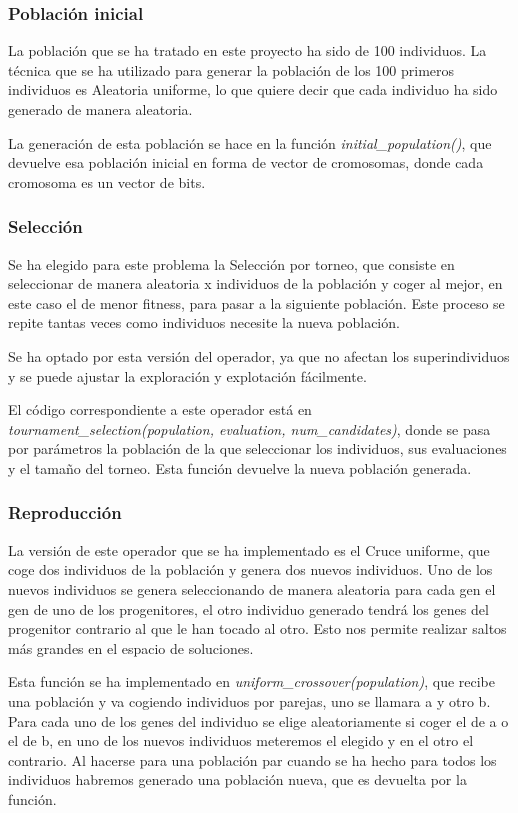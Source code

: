 \documentclass[12pt, spanish, pdftex]{UC3M_document}
\begin{document}
\subsubsection{Población inicial}
La población que se ha tratado en este proyecto ha sido de 100 individuos. La técnica que se ha utilizado para generar la población de los 100 primeros individuos es Aleatoria uniforme, lo que quiere decir que cada individuo ha sido generado de manera aleatoria. 

La generación de esta población se hace en la función \textit{initial\_population()}, que devuelve esa población inicial en forma de vector de cromosomas, donde cada cromosoma es un vector de bits.

\subsubsection{Selección}
Se ha elegido para este problema la Selección por torneo, que consiste en seleccionar de manera aleatoria x individuos de la población y coger al mejor, en este caso el de menor fitness, para pasar a la siguiente población. Este proceso se repite tantas veces como individuos necesite la nueva población.

Se ha optado por esta versión del operador, ya que no afectan los superindividuos y se puede ajustar la exploración y explotación fácilmente.

El código correspondiente a este operador está en \textit{tournament\_selection(population, evaluation, num\_candidates)}, donde se pasa por parámetros la población de la que seleccionar los individuos, sus evaluaciones y el tamaño del torneo. Esta función devuelve la nueva población generada.

\subsubsection{Reproducción}
La versión de este operador que se ha implementado es el Cruce uniforme, que coge dos individuos de la población y genera dos nuevos individuos. Uno de los nuevos individuos se genera seleccionando de manera aleatoria para cada gen el gen de uno de los progenitores, el otro individuo generado tendrá los genes del progenitor contrario al que le han tocado al otro. Esto nos permite realizar saltos más grandes en el espacio de soluciones.

Esta función se ha implementado en \textit{uniform\_crossover(population)}, que recibe una población y va cogiendo individuos por parejas, uno se llamara a y otro b. Para cada uno de los genes del individuo se elige aleatoriamente si coger el de a o el de b, en uno de los nuevos individuos meteremos el elegido y en el otro el contrario. Al hacerse para una población par cuando se ha hecho para todos los individuos habremos generado una población nueva, que es devuelta por la función.
\end{document}
